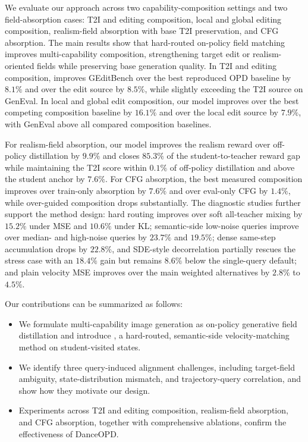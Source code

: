 We evaluate our approach across two capability-composition settings and two field-absorption cases: T2I and editing composition, local and global editing composition, realism-field absorption with base T2I preservation, and CFG absorption. The main results show that hard-routed on-policy field matching improves multi-capability composition, strengthening target edit or realism-oriented fields while preserving base generation quality. 
In T2I and editing composition, \name{} improves GEditBench over the best reproduced OPD baseline by $8.1\%$ and over the edit source by $8.5\%$, while slightly exceeding the T2I source on GenEval. 
In local and global edit composition, our model improves over the best competing composition baseline by $16.1\%$ and over the local edit source by $7.9\%$, with GenEval above all compared composition baselines. 

For realism-field absorption, our model improves the realism reward over off-policy distillation by $9.9\%$ and closes $85.3\%$ of the student-to-teacher reward gap while maintaining the T2I score within $0.1\%$ of off-policy distillation and above the student anchor by $7.6\%$. For CFG absorption, the best measured composition improves over train-only absorption by $7.6\%$ and over eval-only CFG by $1.4\%$, while over-guided composition drops substantially. The diagnostic studies further support the method design: hard routing improves over soft all-teacher mixing by $15.2\%$ under MSE and $10.6\%$ under KL; semantic-side low-noise queries improve over median- and high-noise queries by $23.7\%$ and $19.5\%$; dense same-step accumulation drops by $22.8\%$, and SDE-style decorrelation partially rescues the stress case with an $18.4\%$ gain but remains $8.6\%$ below the single-query default; and plain velocity MSE improves over the main weighted alternatives by $2.8\%$ to $4.5\%$.


Our contributions can be summarized as follows:
\begin{itemize}[left=1pt]
    \item We formulate multi-capability image generation as on-policy generative field distillation and introduce \name{}, a hard-routed, semantic-side velocity-matching method on student-visited states.
    \item We identify three query-induced alignment challenges, including target-field ambiguity, state-distribution mismatch, and trajectory-query correlation, and show how they motivate our design.
    \item Experiments across T2I and editing composition, realism-field absorption, and CFG absorption, together with comprehensive ablations, confirm the effectiveness of DanceOPD.
\end{itemize}
